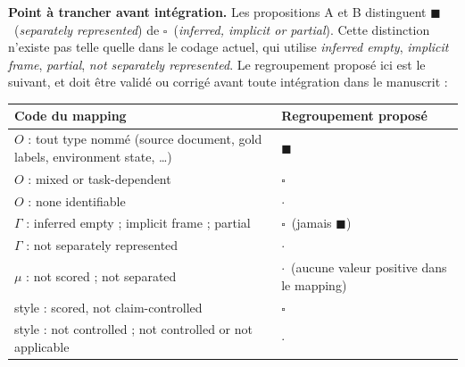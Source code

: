 \documentclass[10pt]{article}
\newcommand{\yes}{\textcolor{clrLD}{$\blacksquare$}}
\newcommand{\hf}{\textcolor{clrO}{$\square$}}
\newcommand{\no}{\textcolor{clrG!45}{$\cdot$}}
\begin{document}
\vspace{8pt}
\noindent\textbf{Point \`a trancher avant int\'egration.} Les propositions A et B distinguent
\yes\ (\emph{separately represented}) de \hf\ (\emph{inferred, implicit or partial}). Cette distinction
n'existe pas telle quelle dans le codage actuel, qui utilise \emph{inferred empty}, \emph{implicit frame},
\emph{partial}, \emph{not separately represented}. Le regroupement propos\'e ici est le suivant, et doit
\^etre valid\'e ou corrig\'e avant toute int\'egration dans le manuscrit :

\vspace{4pt}
\noindent
\begin{tabular}{@{}ll@{}}
\toprule
\textbf{Code du mapping} & \textbf{Regroupement propos\'e}\\
\midrule
$O$ : tout type nomm\'e (source document, gold labels, environment state, \dots) & \yes\\
$O$ : mixed or task-dependent & \hf\\
$O$ : none identifiable & \no\\
$\Gamma$ : inferred empty ; implicit frame ; partial & \hf\ (jamais \yes)\\
$\Gamma$ : not separately represented & \no\\
$\mu$ : not scored ; not separated & \no\ (aucune valeur positive dans le mapping)\\
style : scored, not claim-controlled & \hf\\
style : not controlled ; not controlled or not applicable & \no\\
\bottomrule
\end{tabular}
\end{document}

